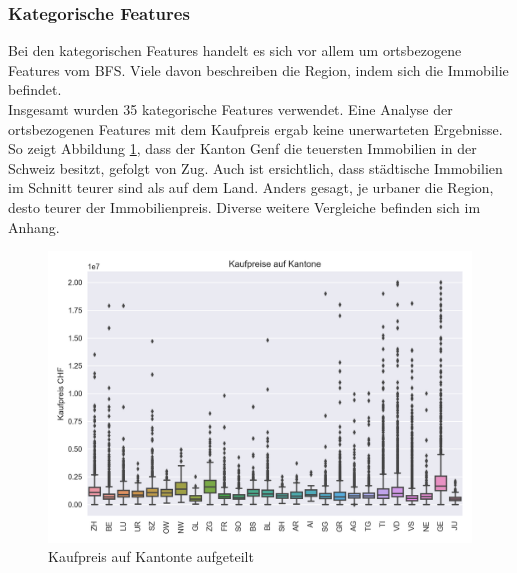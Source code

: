 \subsubsection{Kategorische Features}
Bei den kategorischen Features handelt es sich vor allem um ortsbezogene Features vom BFS. Viele davon beschreiben die Region, indem sich die Immobilie befindet.\\
Insgesamt wurden 35 kategorische Features verwendet. Eine Analyse der ortsbezogenen Features mit dem Kaufpreis ergab keine unerwarteten Ergebnisse. So zeigt Abbildung \ref{fig:cantons}, dass der Kanton Genf die teuersten Immobilien in der Schweiz besitzt, gefolgt von Zug. Auch ist ersichtlich, dass städtische Immobilien im Schnitt teurer sind als auf dem Land. Anders gesagt, je urbaner die Region, desto teurer der Immobilienpreis. Diverse weitere Vergleiche befinden sich im Anhang.\\[2ex]
\begin{figure}[ht]
\centering
\includegraphics[width=\textwidth]{images/boxPlot_cantons.png}
\caption[Kaufpreis auf Kantonte aufgeteilt]{Kaufpreis auf Kantonte aufgeteilt}%
\label{fig:cantons}
\end{figure}

